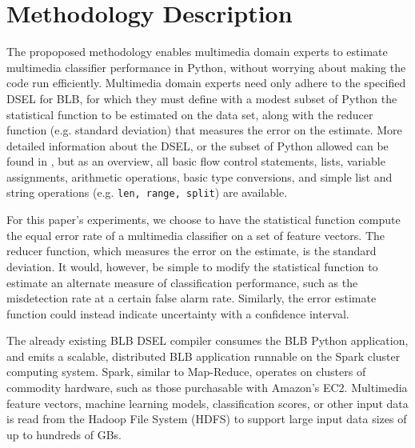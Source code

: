 \section{Methodology Description}

The propoposed methodology enables multimedia domain experts to estimate multimedia classifier performance in Python, without worrying about making the code run efficiently. 
Multimedia domain experts need only adhere to the specified DSEL for BLB, for which they must define with a modest subset of Python the statistical function to be estimated on the data set, along with the reducer function (e.g. standard deviation) that measures the error on the estimate.
More detailed information about the DSEL, or the subset of Python allowed can be found in \cite{pbirsinger2013}, but as an overview, all basic flow control statements, lists, variable assignments, arithmetic operations, basic type conversions, and simple list and string operations (e.g. \texttt{len, range, split}) are available. 

For this paper's experiments, we choose to have the statistical function compute the equal error rate of a multimedia classifier on a set of feature vectors. 
The reducer function, which measures the error on the estimate, is the standard deviation. 
It would, however, be simple to modify the statistical function to estimate an alternate measure of classification performance, such as the misdetection rate at a certain false alarm rate. 
Similarly, the error estimate function could instead indicate uncertainty with a confidence interval.  

The already existing BLB DSEL compiler consumes the BLB Python application, and emits
a scalable, distributed BLB application runnable on the Spark cluster computing system. 
Spark, similar to Map-Reduce, operates on clusters of commodity hardware, such as those purchasable with
Amazon's EC2. Multimedia feature vectors, machine learning models, classification scores, or other input
data is read from the Hadoop File System (HDFS) to support large input data sizes of up to hundreds of GBs. 
